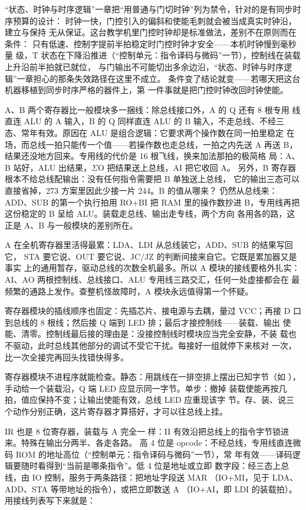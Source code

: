 \begin{warningbox}
“状态、时钟与时序逻辑”一章把“用普通与门切时钟”列为禁令，针对的是有同步时序预算的设计：
时钟一快，门控引入的偏斜和使能毛刺就会被当成真实时钟沿，建立与保持
无从保证。这台教学机里门控时钟却是标准做法，差别不在原则而在条件：
只有低速、控制字提前半拍稳定时门控时钟才安全——本机时钟慢到毫秒量
级，T 状态在下降沿推进（“控制单元：指令译码与微码”一节），控制线在装载上升沿前半拍就已就位，
与门输出不可能切出多余边沿，“状态、时钟与时序逻辑”一章担心的那条失效路径在这里不成立。
条件变了结论就变——若哪天把这台机器移植到同步时序严格的器件上，第
一件事就是把门控时钟改回时钟使能。
\end{warningbox}

A、B 两个寄存器比一般模块多一捆线：除总线接口外，A 的 Q 还有 8 根专用
线直连 ALU 的 A 输入，B 的 Q 同样直连 ALU 的 B 输入，不走总线、不经三
态、常年有效。原因在 ALU 是组合逻辑：它要求两个操作数在同一拍里稳定
在场，而总线一拍只能传一个值——若操作数也走总线，一拍之内先送 A 再送
B，结果还没地方回来。专用线的代价是 16 根飞线，换来加法那拍的极简格
局：A、B 站好，ALU 出结果，$\Sigma$O 把结果送上总线，AI 把它收回 A。
另外，B 寄存器根本不给总线配输出：没有任何指令需要把 B 单独送上总线，
它的输出三态可以直接省掉，273 方案里因此少接一片 244。B 的值从哪来？
仍然从总线来：ADD、SUB 的第一个执行拍用 RO+BI 把 RAM 里的操作数抄进
B，专用线再把这份稳定的 B 呈给 ALU。装载走总线、输出走专线，两个方向
各用各的路，这正是 A、B 与一般模块的差别所在。

A 在全机寄存器里活得最累：LDA、LDI 从总线装它，ADD、SUB 的结果写回它，
STA 要它说、OUT 要它说、JC/JZ 的判断间接来自它。它既是累加器又是事实
上的通用暂存，驱动总线的次数全机最多。所以 A 模块的接线要格外扎实：
AI、AO 两根控制线、总线接口、ALU 专用线三路交汇，任何一处虚接都会在
最频繁的通路上发作。查整机怪故障时，A 模块永远值得第一个怀疑。

寄存器模块的插线顺序也固定：先插芯片、接电源与去耦，量过 VCC；再接 D
口到总线的 8 根线；然后接 Q 端到 LED 排；最后才接控制线——装载、输出
使能、清零。控制线最后接的理由是：没接控制线时模块应当完全安静，不装
载也不驱动，此时总线其他部分的调试不受它干扰。每接好一组就停下来核对
一次，比一次全接完再回头找错快得多。

寄存器模块不进程序就能检查。静态：用跳线在一排空排上摆出已知字节（如
），手动给一个装载沿，Q 端 LED 应显示同一字节。单步：撤掉
装载使能再按几拍，值应保持不变；让输出使能有效，总线 LED 应重现该字
节。存、装、说三个动作分别正确，这片寄存器才算搭好，才可以往总线上挂。

IR 也是 8 位寄存器，装载与 A 完全一
样：II 有效沿把总线上的指令字节锁进来。特殊在输出分两半、各走各路。
高 4 位是 opcode：不经总线，专用线直连微码 ROM 的地址高位（“控制单元：指令译码与微码”一节），常
年有效——译码逻辑要随时看得到“当前是哪条指令”。低 4 位是地址或立即
数字段：经三态上总线，由 IO 控制，服务于两条路径：把地址字段送 MAR
（IO+MI，见于 LDA、ADD、STA 等带地址的指令），或把立即数送 A
（IO+AI，即 LDI 的装载拍）。用接线列表写下来就是：

